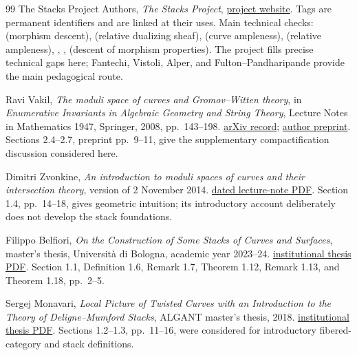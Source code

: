 \begin{thebibliography}{99}
The Stacks Project Authors, \emph{The Stacks Project},
\href{https://stacks.math.columbia.edu}{project website}.
Tags are permanent identifiers and are linked at their uses.
Main technical checks:  (morphism descent),
 (relative dualizing sheaf), 
(curve ampleness),  (relative ampleness),
, ,  (descent of
morphism properties). The project fills precise technical
gaps here; Fantechi, Vistoli, Alper, and Fulton--Pandharipande
provide the main pedagogical route.

Ravi Vakil, \emph{The moduli space of curves and Gromov--Witten
theory}, in \emph{Enumerative Invariants in Algebraic Geometry
and String Theory}, Lecture Notes in Mathematics 1947,
Springer, 2008, pp.~143--198.
\href{https://arxiv.org/abs/math/0602347}{arXiv record};
\href{https://math.stanford.edu/~vakil/files/cimefeb26.pdf}{author preprint}.
Sections 2.4--2.7, preprint pp.~9--11, give the supplementary
compactification discussion considered here.

Dimitri Zvonkine, \emph{An introduction to moduli spaces of
curves and their intersection theory}, version of 2 November 2014.
\href{https://math.hse.ru/data/2014/11/13/1101420186/2013.04.03.pdf}{dated lecture-note PDF}.
Section 1.4, pp.~14--18, gives geometric intuition; its
introductory account deliberately does not develop the stack
foundations.

Filippo Belfiori, \emph{On the Construction of Some Stacks of
Curves and Surfaces}, master's thesis, Universit\`a di Bologna,
academic year 2023--24.
\href{https://amslaurea.unibo.it/id/eprint/35200/1/Tesi_BelfioriFilippo.pdf}{institutional thesis PDF}.
Section 1.1, Definition 1.6, Remark 1.7, Theorem 1.12,
Remark 1.13, and Theorem 1.18, pp.~2--5.

Sergej Monavari, \emph{Local Picture of Twisted Curves with
an Introduction to the Theory of Deligne--Mumford Stacks},
ALGANT master's thesis, 2018.
\href{https://www.math.u-bordeaux.fr/~ybilu/algant/documents/theses/Monavari.pdf}{institutional thesis PDF}.
Sections 1.2--1.3, pp.~11--16, were considered for introductory
fibered-category and stack definitions.

\end{thebibliography}
